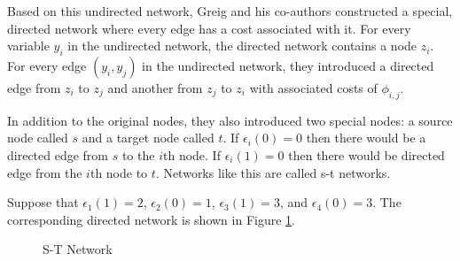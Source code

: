 \begin{figure}[!h]
\centering


\end{figure}

Based on this undirected network, Greig and his co-authors constructed
a special, directed network where every edge has a cost associated
with it. For every variable $y_i$ in the undirected network, the
directed network contains a node $z_i$.  For every edge $(y_i, y_j)$ in the
undirected network, they introduced a directed edge from $z_i$ to $z_j$ and
another from $z_j$ to $z_i$ with associated costs of $\phi_{i,j}$.

In addition to the original nodes, they also introduced two special
nodes: a source node called $s$ and a target node called
$t$. If $\epsilon_i(0) = 0$ then there would be a directed edge from
$s$ to the $i$th node. If $\epsilon_i(1) = 0$ then there would be
directed edge from the $i$th node to $t$. Networks like this are
called s-t networks.

Suppose that $\epsilon_1(1)=2$, $\epsilon_2(0)=1$, $\epsilon_3(1)=3$,
and $\epsilon_4(0)=3$. The corresponding directed network is shown in
Figure \ref{fig:directed}. 

\begin{figure}[!h]
\centering

\caption{S-T Network}
\label{fig:directed}
\end{figure}


